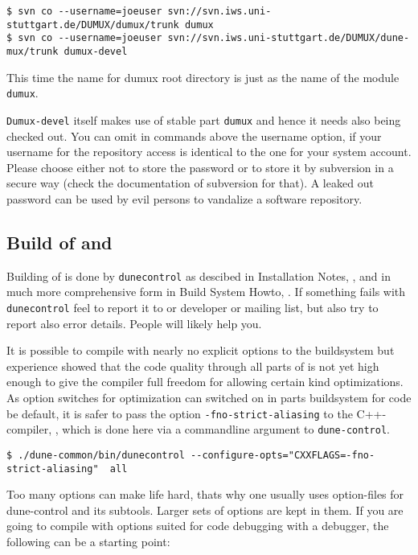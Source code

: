 \begin{lstlisting}[style=Bash]
$ svn co --username=joeuser svn://svn.iws.uni-stuttgart.de/DUMUX/dumux/trunk dumux
$ svn co --username=joeuser svn://svn.iws.uni-stuttgart.de/DUMUX/dune-mux/trunk dumux-devel
\end{lstlisting}

This time the name for dumux root directory is just as the name of the module \texttt{dumux}.

\texttt{Dumux-devel} itself makes use of stable part \texttt{dumux} and hence it needs also being checked out. 
You can omit in commands above the username option, if your username for the repository access is identical to the one for your system account.
Please choose either not to store the password or to store it by subversion in a secure way (check the documentation of subversion for that). 
A leaked out password can be used by evil persons to vandalize a software repository.

\subsection{Build of \Dune and \Dumux}
\label{buildIt}
Building of \Dune is done by \texttt{dunecontrol} as descibed in \Dune Installation Notes, \cite{DUNE-INST}, and in much more comprehensive form in \Dune Build System Howto, \cite{DUNE-BS}.
If something fails with \texttt{dunecontrol} feel to report it to \Dune or \Dumux developer or mailing list, but also try to report also error details. People will likely help you.


It is possible to compile \Dumux with nearly no explicit options to the buildsystem but
experience showed that the code quality through all parts of \Dune is not yet high enough to give the compiler full freedom for allowing certain kind optimizations. As option switches for optimization can switched on in parts buildsystem for code be default, it is safer to pass the option \texttt{-fno-strict-aliasing} to the C++-compiler, \cite{WIKIPED-ALIASING}, which is done here via a commandline argument to \texttt{dune-control}.


\begin{lstlisting}[style=Bash]
$ ./dune-common/bin/dunecontrol --configure-opts="CXXFLAGS=-fno-strict-aliasing"  all
\end{lstlisting}

Too many options can make life hard, thats why one usually uses option-files for dune-control and its subtools.
Larger sets of options are kept in them. 
If you are going to compile with options suited for code debugging with a debugger, the following
can be a starting point:

